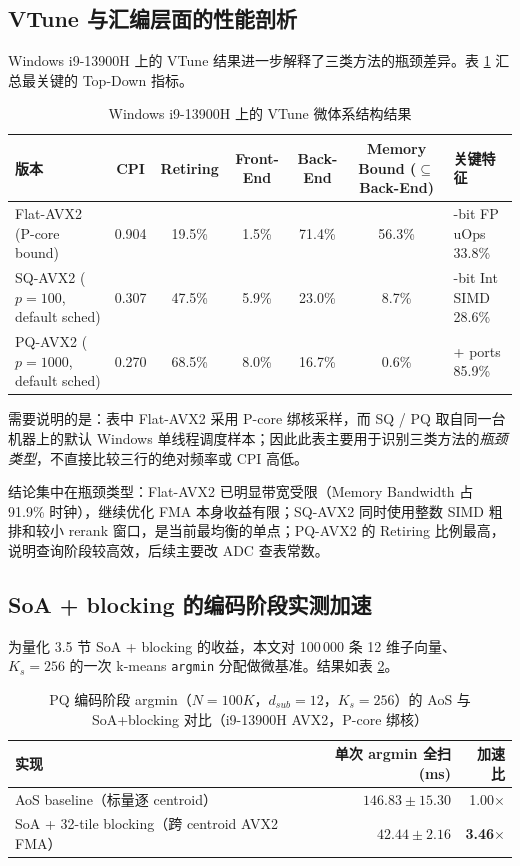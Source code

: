 \documentclass[a4paper,11pt,UTF8]{ctexart}
\begin{document}
\subsection{VTune 与汇编层面的性能剖析}

Windows i9-13900H 上的 VTune 结果进一步解释了三类方法的瓶颈差异。表 \ref{tab:vtune} 汇总最关键的 Top-Down 指标。

\begin{table}[H]
  \centering\small
  \begin{tabular}{p{2.5cm}ccccc>{\raggedright\arraybackslash}p{2.6cm}}
    \toprule
    版本 & CPI & Retiring & Front-End & Back-End & \shortstack{Memory Bound\\{\scriptsize($\subseteq$ Back-End)}} & 关键特征 \\
    \midrule
    Flat-AVX2 (P-core bound) & 0.904 & 19.5\% & 1.5\% & 71.4\% & 56.3\% & 256-bit FP uOps 33.8\% \\
    SQ-AVX2 ($p=100$, default sched) & 0.307 & 47.5\% & 5.9\% & 23.0\% & 8.7\% & 256-bit Int SIMD 28.6\% \\
    PQ-AVX2 ($p=1000$, default sched) & 0.270 & 68.5\% & 8.0\% & 16.7\% & 0.6\% & 3+ ports 85.9\% \\
    \bottomrule
  \end{tabular}
  \caption{Windows i9-13900H 上的 VTune 微体系结构结果}
  \label{tab:vtune}
\end{table}

需要说明的是：表中 Flat-AVX2 采用 P-core 绑核采样，而 SQ / PQ 取自同一台机器上的默认 Windows 单线程调度样本；因此此表主要用于识别三类方法的\emph{瓶颈类型}，不直接比较三行的绝对频率或 CPI 高低。

结论集中在瓶颈类型：Flat-AVX2 已明显带宽受限（Memory Bandwidth 占 91.9\% 时钟），继续优化 FMA 本身收益有限；SQ-AVX2 同时使用整数 SIMD 粗排和较小 rerank 窗口，是当前最均衡的单点；PQ-AVX2 的 Retiring 比例最高，说明查询阶段较高效，后续主要改 ADC 查表常数。

\subsection{SoA + blocking 的编码阶段实测加速}
\label{sec:soa_speedup}

为量化 3.5 节 SoA + blocking 的收益，本文对 100\,000 条 12 维子向量、$K_s=256$ 的一次 k-means \texttt{argmin} 分配做微基准。结果如表 \ref{tab:soa_vs_aos}。

\begin{table}[H]
  \centering\small
  \begin{tabular}{lrr}
    \toprule
    实现 & 单次 argmin 全扫 (ms) & 加速比 \\
    \midrule
    AoS baseline（标量逐 centroid） & $146.83 \pm 15.30$ & 1.00$\times$ \\
    SoA + 32-tile blocking（跨 centroid AVX2 FMA） & $42.44 \pm 2.16$ & \textbf{3.46}$\times$ \\
    \bottomrule
  \end{tabular}
  \caption{PQ 编码阶段 argmin（$N=100K$，$d_{sub}=12$，$K_s=256$）的 AoS 与 SoA+blocking 对比（i9-13900H AVX2，P-core 绑核）}
  \label{tab:soa_vs_aos}
\end{table}
\end{document}
